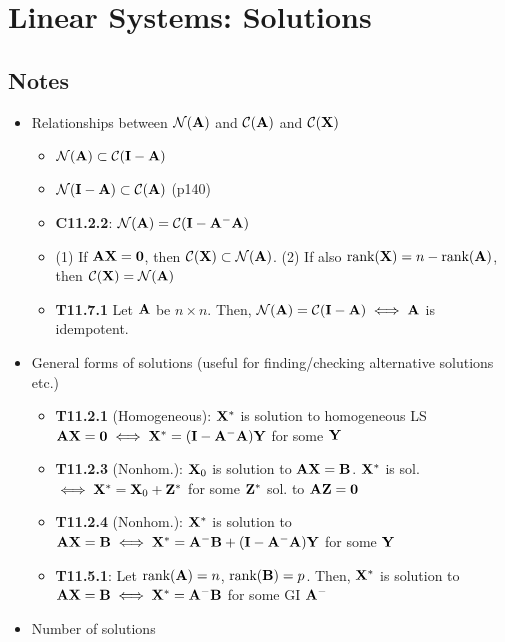 \documentclass[a4paper, oneside]{book}
\begin{document}
\chapter{Linear Systems: Solutions}



\section*{Notes}
\begin{itemize}
\item Relationships between $\mathcal{N}(\mathbf{A})$ and $\mathcal{C}(\mathbf{A})$ and $\mathcal{C}(\mathbf{X})$
	\begin{itemize}
	\item $\mathcal{N}(\mathbf{A}) \subset \mathcal{C}(\mathbf{I-A})$
	\item $\mathcal{N}(\mathbf{I-A}) \subset \mathcal{C}(\mathbf{A})$ (p140)
	\item \textbf{C11.2.2}: $\mathcal{N}(\mathbf{A})=\mathcal{C}(\mathbf{I-A^-A})$ 
	\item (1) If $\mathbf{AX=0}$, then $\mathcal{C}(\mathbf{X})\subset \mathcal{N}(\mathbf{A})$. (2) If also $\text{rank}(\mathbf{X})=n-\text{rank}(\mathbf{A})$, then $\mathcal{C}(\mathbf{X})=\mathcal{N}(\mathbf{A})$
	\item \textbf{T11.7.1} Let $\mathbf{A}$ be $n\times n$.  Then, $\mathcal{N}(\mathbf{A})=\mathcal{C}(\mathbf{I-A}) \iff \mathbf{A}$ is idempotent.
	\end{itemize}
\item General forms of solutions (useful for finding/checking alternative solutions etc.)
	\begin{itemize}
	\item \textbf{T11.2.1} (Homogeneous): $\mathbf{X}^*$ is solution to homogeneous LS $\mathbf{AX=0} \iff \mathbf{X}^{*}=(\mathbf{I-A^- A})\mathbf{Y}$ for some $\mathbf{Y}$ 
	\item \textbf{T11.2.3} (Nonhom.): $\mathbf{X}_0$ is solution to $\mathbf{AX=B}$. $\mathbf{X}^{*}$ is sol. $\iff \mathbf{X}^*=\mathbf{X}_0+\mathbf{Z}^*$ for some $\mathbf{Z}^*$ sol. to $\mathbf{AZ=0}$
	\item \textbf{T11.2.4} (Nonhom.): $\mathbf{X}^{*}$ is solution to $\mathbf{AX=B} \iff \mathbf{X}^*=\mathbf{A^-B}+(\mathbf{I-A^-A})\mathbf{Y}$ for some $\mathbf{Y}$
	\item \textbf{T11.5.1}: Let $\text{rank}(\mathbf{A})=n$, $\text{rank}(\mathbf{B})=p$. Then, $\mathbf{X}^*$ is solution to $\mathbf{AX=B} \iff \mathbf{X}^*=\mathbf{A^-B}$ for some GI $\mathbf{A^-}$
	\end{itemize}
\item Number of solutions
	\begin{itemize}

\end{itemize}
\end{itemize}
\end{document}
